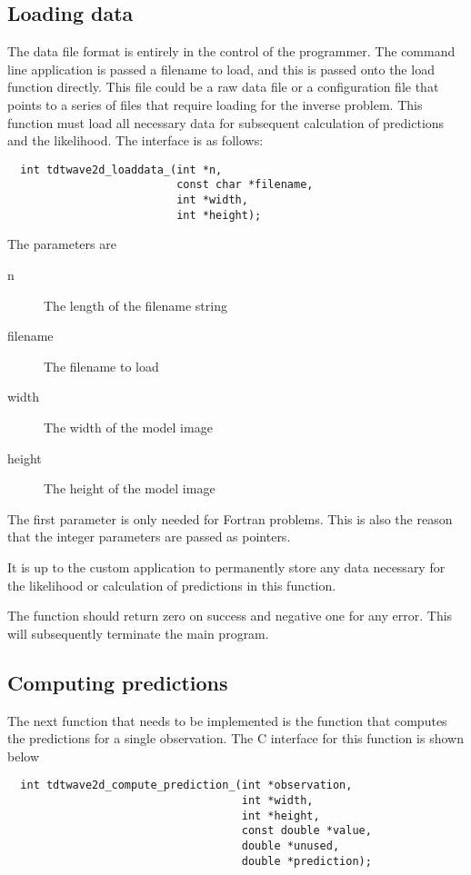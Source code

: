 \documentclass[a4paper,12pt]{article}
\begin{document}
\subsection{Loading data}

The data file format is entirely in the control of the programmer.
The command line application is passed a filename to load, and this is
passed onto the load function directly. This file could be a raw data
file or a configuration file that points to a series of files that
require loading for the inverse problem. This function must load all
necessary data for subsequent calculation of predictions and the
likelihood. The interface is as follows:

\begin{verbatim}
  int tdtwave2d_loaddata_(int *n,
                          const char *filename,
                          int *width,
                          int *height);
\end{verbatim}

The parameters are

\begin{description}
\item[n] The length of the filename string
\item[filename] The filename to load
\item[width] The width of the model image
\item[height] The height of the model image
\end{description}

The first parameter is only needed for Fortran problems. This is also
the reason that the integer parameters are passed as pointers.

It is up to the custom application to permanently store any data
necessary for the likelihood or calculation of predictions in this
function.

The function should return zero on success and negative one for any
error.  This will subsequently terminate the main program.

\subsection{Computing predictions}

The next function that needs to be implemented is the function that
computes the predictions for a single observation. The C interface for
this function is shown below


\begin{verbatim}
  int tdtwave2d_compute_prediction_(int *observation,
                                    int *width, 
                                    int *height,
                                    const double *value,
                                    double *unused,
                                    double *prediction);
\end{verbatim}
\end{document}
